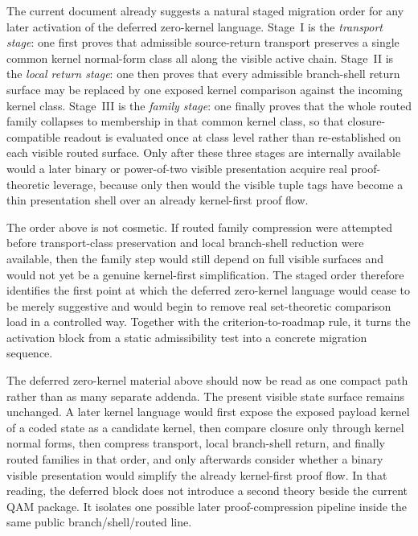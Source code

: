 \begin{remark}\label{rem:qam-zero-kernel-roadmap}
The current document already suggests a natural staged migration order for any later activation of the deferred zero-kernel language.
Stage~I is the \emph{transport stage}: one first proves that admissible source-return transport preserves a single common kernel normal-form class all along the visible active chain.
Stage~II is the \emph{local return stage}: one then proves that every admissible branch-shell return surface may be replaced by one exposed kernel comparison against the incoming kernel class.
Stage~III is the \emph{family stage}: one finally proves that the whole routed family collapses to membership in that common kernel class, so that closure-compatible readout is evaluated once at class level rather than re-established on each visible routed surface.
Only after these three stages are internally available would a later binary or power-of-two visible presentation acquire real proof-theoretic leverage, because only then would the visible tuple tags have become a thin presentation shell over an already kernel-first proof flow.
\end{remark}

\begin{remark}\label{rem:qam-zero-kernel-roadmap-why}
The order above is not cosmetic. If routed family compression were attempted before transport-class preservation and local branch-shell reduction were available, then the family step would still depend on full visible surfaces and would not yet be a genuine kernel-first simplification. The staged order therefore identifies the first point at which the deferred zero-kernel language would cease to be merely suggestive and would begin to remove real set-theoretic comparison load in a controlled way. Together with the criterion-to-roadmap rule, it turns the activation block from a static admissibility test into a concrete migration sequence.
\end{remark}

\begin{remark}\label{rem:qam-zero-kernel-synthesis}
The deferred zero-kernel material above should now be read as one compact path rather than as many separate addenda. The present visible state surface remains unchanged. A later kernel language would first expose the exposed payload kernel of a coded state as a candidate kernel, then compare closure only through kernel normal forms, then compress transport, local branch-shell return, and finally routed families in that order, and only afterwards consider whether a binary visible presentation would simplify the already kernel-first proof flow. In that reading, the deferred block does not introduce a second theory beside the current QAM package. It isolates one possible later proof-compression pipeline inside the same public branch/shell/routed line.
\end{remark}

